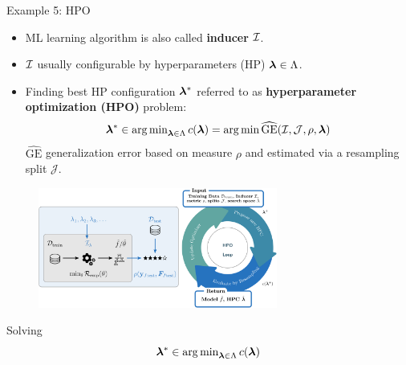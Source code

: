 \begin{vbframe}{Example 5: HPO}
\vspace*{-0.2cm}
\begin{itemize}
	\item ML learning algorithm is also called \textbf{inducer} $\mathcal{I}$.
	\item $\mathcal{I}$ usually configurable by hyperparameters (HP) $\bm{\lambda} \in \Lambda$. 
	\item Finding best HP configuration $\bm{\lambda}^\ast$ referred to as \textbf{hyperparameter optimization (HPO)} problem: 
	$$
	\bm{\lambda}^\ast \in \operatorname{arg\,min}\nolimits_{\bm{\lambda} \in \Lambda} c(\bm{\lambda}) = \operatorname{arg\,min} \widehat{\text{GE}}(\mathcal{I}, \mathcal{J}, \rho, \bm{\lambda})
	$$
	$\widehat{\text{GE}}$ generalization error based on measure $\rho$ and estimated via a resampling split $\mathcal{J}$. 
\end{itemize}

\vspace*{-0.2cm}

\begin{figure}[h]
	\centering
	\includegraphics[width = 0.7\textwidth]{figure_man/hpo_loop_1.png}
\end{figure}

\framebreak 
		
Solving 
\vspace*{-0.2cm}
$$
\bm{\lambda}^\ast \in \operatorname{arg\,min}_{\bm{\lambda} \in \Lambda} c(\bm{\lambda})
$$


\end{vbframe}
